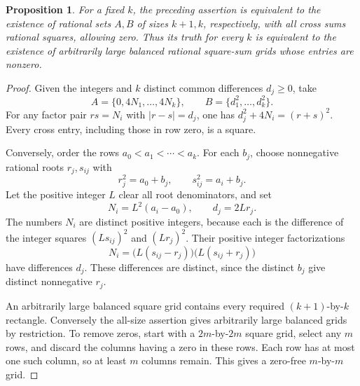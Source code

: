 \documentclass[11pt,letterpaper]{article}
\newtheorem{proposition}[theorem]{Proposition}
\theoremstyle{remark}\newtheorem{remark}[theorem]{Remark}
\begin{document}
\begin{proposition}\label{prop:grid}
For a fixed $k$, the preceding assertion is equivalent to the existence of rational sets $A,B$ of sizes $k+1,k$, respectively, with all cross sums rational squares, allowing zero. Thus its truth for every $k$ is equivalent to the existence of arbitrarily large balanced rational square-sum grids whose entries are nonzero.
\end{proposition}
\begin{proof}
Given the integers and $k$ distinct common differences $d_j\ge0$, take
\[
 A=\{0,4N_1,\ldots,4N_k\},\qquad B=\{d_1^2,\ldots,d_k^2\}.
\]
For any factor pair $rs=N_i$ with $|r-s|=d_j$, one has $d_j^2+4N_i=(r+s)^2$. Every cross entry, including those in row zero, is a square.

Conversely, order the rows $a_0<a_1<\cdots<a_k$. For each $b_j$, choose nonnegative rational roots $r_j,s_{ij}$ with
\[
 r_j^2=a_0+b_j,\qquad s_{ij}^2=a_i+b_j.
\]
Let the positive integer $L$ clear all root denominators, and set
\[
 N_i=L^2(a_i-a_0),\qquad d_j=2Lr_j.
\]
The numbers $N_i$ are distinct positive integers, because each is the difference of the integer squares $(Ls_{ij})^2$ and $(Lr_j)^2$. Their positive integer factorizations
\[
 N_i=\bigl(L(s_{ij}-r_j)\bigr)\bigl(L(s_{ij}+r_j)\bigr)
\]
have differences $d_j$. These differences are distinct, since the distinct $b_j$ give distinct nonnegative $r_j$.

An arbitrarily large balanced square grid contains every required $(k+1)$-by-$k$ rectangle. Conversely the all-size assertion gives arbitrarily large balanced grids by restriction. To remove zeros, start with a $2m$-by-$2m$ square grid, select any $m$ rows, and discard the columns having a zero in these rows. Each row has at most one such column, so at least $m$ columns remain. This gives a zero-free $m$-by-$m$ grid.
\end{proof}
\end{document}
